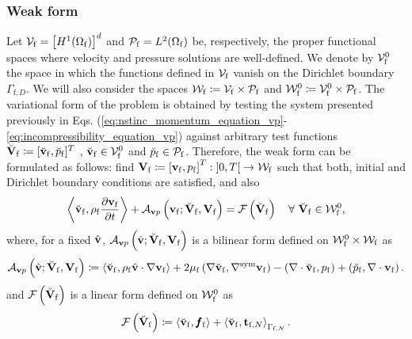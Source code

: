 \documentclass[11pt,english]{article}
\def\densfluid{\rho_{\rm{f}}}                %
\def\viscfluid{\mu_{\rm{f}}}                 %
\def\domainfluid{\Omega_{\rm{f}}}
\def\boundaryfluidD{\Gamma_{\mathrm{f},D}}
\def\boundaryfluidN{\Gamma_{\mathrm{f},N}}
\def\vfluid{\vb{v}_{\rm{f}}}               %
\def\pfluid{p_{\mathrm{f}}}                %
\def\bodyffluid{\pmb{f}_{\rm{f}}}          %
\def\tfluidN{\vb{t}_{\mathrm{f},N}}
\def\vhat{\hat{\vb{v}}}
\def\unknofluid{\vb{V}_{\mathrm{f}}}
\def\vfluidspace{\mathcal{V}_{\rm{f}}}          %
\def\pfluidspace{\mathcal{P}_{\rm{f}}}          %
\def\unknofluidspace{\mathcal{W}_{\rm{f}}}      %
\def\testfluid{\breve{\vb{V}}_{\rm f}}
\def\testvfluid{\breve{\vb{v}}_{\rm f}}
\def\testpfluid{\breve{p}_{\rm f}}
\def\testvfluidspace{\mathcal{V}_{\rm{f}}^0}    %
\def\testfluidspace{\mathcal{W}_{\rm{f}}^0}     %
\def\vp{\vb{v}p}
\def\timeint{\left ] 0,T\right[}                         %
\begin{document}
\subsubsection{Weak form}
Let $\vfluidspace = \left [ H^1(\domainfluid) \right ]^d $ and $\pfluidspace =L^2(\domainfluid)$ be, respectively, the proper functional spaces where velocity and pressure solutions are well-defined. We denote by $\testvfluidspace$ the space in which the functions defined in $\vfluidspace$ vanish on the Dirichlet boundary $\boundaryfluidD$. 
We will also consider the spaces $\unknofluidspace \coloneqq \vfluidspace \times \pfluidspace$ and $\testfluidspace \coloneqq \testvfluidspace \times \pfluidspace$. The variational form of the problem is obtained by testing the system presented previously in Eqs. (\ref{eq:nstinc_momentum_equation_vp}-\ref{eq:incompressibility_equation_vp}) against arbitrary test functions $\testfluid \coloneqq [\testvfluid,\testpfluid]^T$ , $\testvfluid \in \testvfluidspace $ and $\testpfluid \in \pfluidspace$. 
Therefore, the weak form can be formulated as follows: find $\unknofluid \coloneqq \left [ \vfluid, \pfluid \right ]^T : \timeint \rightarrow \unknofluidspace$ such that both, initial and Dirichlet boundary conditions are satisfied, and also
\begin{equation*}
    \left\langle  \testvfluid, \densfluid\frac{\partial \vfluid}{\partial t} \right \rangle + \mathcal{A}_{\vp} \left ( \vfluid; \testfluid, \unknofluid  \right) = \mathcal{F} \left ( \testfluid  \right) \quad \forall \ \testfluid \in \testfluidspace,
\end{equation*}
where, for a fixed $\vhat$,  $\mathcal{A}_{\vp} \left ( \vhat; \testfluid, \unknofluid \right)$ is a bilinear form defined on $\testfluidspace \times \unknofluidspace$ as
\begin{alignat*}{1}
    \mathcal{A}_{\vp} \left (\vhat; \testfluid, \unknofluid \right) \coloneqq \left \langle \testvfluid,  \densfluid \vhat \cdot \nabla \vfluid  \right \rangle + 2\viscfluid \left (\nabla \testvfluid,  \nabla^\mathrm{sym} \vfluid \right )  - \left( \nabla \cdot \testvfluid, \pfluid \right) + \left(  \testpfluid, \nabla \cdot \vfluid \right).   
\end{alignat*}
and $\mathcal{F} \left ( \testfluid  \right)$ is a linear form defined on $\testfluidspace$ as
\begin{equation}
    \mathcal{F} \left ( \testfluid  \right) \coloneqq \left \langle  \testvfluid, \bodyffluid \right \rangle + \left \langle  \testvfluid, \tfluidN \right \rangle_{\boundaryfluidN}.
    \label{eq:27zero}
\end{equation}
\end{document}
